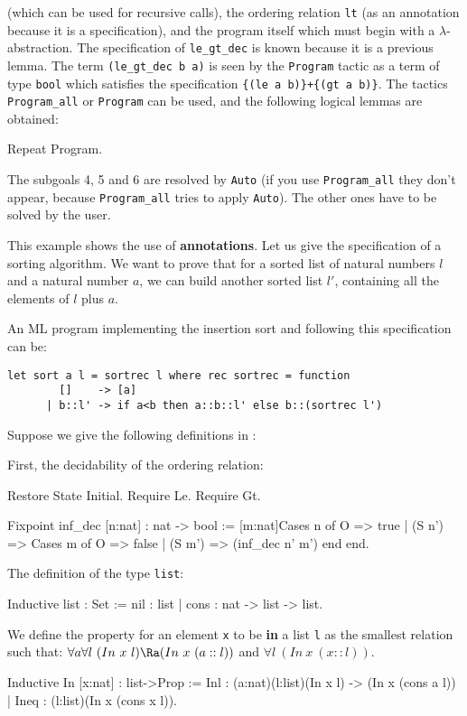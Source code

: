 (which can be used for recursive calls), the ordering relation
\verb=lt= (as an annotation because it is a specification), and the
program itself which must begin with a $\lambda$-abstraction. The
specification of \verb=le_gt_dec= is known because it is a previous
lemma.
The term \verb!(le_gt_dec b a)! is seen by the \verb!Program! tactic
as a term of type \verb!bool! which satisfies the specification 
\verb!{(le a b)}+{(gt a b)}!. 
The tactics \verb=Program_all= or \verb=Program= can be used, and the
following logical lemmas are obtained:
\begin{coq_example}
Repeat Program.
\end{coq_example}
The subgoals 4, 5 and 6 are resolved by \verb=Auto= (if you use
\verb=Program_all= they don't appear, because \verb=Program_all= tries
to apply \verb=Auto=). The other ones have to be solved by the user.


This example shows the use of {\bf annotations}. Let us give the
specification of a sorting algorithm. We want to prove that for a
sorted list of natural numbers $l$ and a natural number $a$, we can
build another sorted list $l'$, containing all the elements of $l$
plus $a$.

An ML program implementing the insertion sort and following this
specification can be:
\begin{verbatim}
let sort a l = sortrec l where rec sortrec = function
        []    -> [a]
      | b::l' -> if a<b then a::b::l' else b::(sortrec l')
\end{verbatim}
Suppose we give the following definitions in \Coq:

First, the decidability of the ordering relation:
\begin{coq_eval}
Restore State Initial.
Require Le.
Require Gt.
\end{coq_eval}
\begin{coq_example*}
Fixpoint inf_dec [n:nat] : nat -> bool :=
[m:nat]Cases n of
         O      => true
       | (S n') => Cases m of
                      O     => false 
                   | (S m') => (inf_dec n' m')
                   end 
       end.
\end{coq_example*}

The definition of the type \verb=list=:
\begin{coq_example*}
Inductive list : Set := nil : list | cons : nat -> list -> list.
\end{coq_example*}

We define the property for an element \verb=x= to be {\bf in} a list
\verb=l= as the smallest relation such that: $\forall a \forall
l~(In~x~l) \Ra (In~x~(a::l))$ and $\forall l~(In~x~(x::l))$.
\begin{coq_example*}
Inductive In [x:nat] : list->Prop
        := Inl  : (a:nat)(l:list)(In x l) -> (In x (cons a l))
        | Ineq : (l:list)(In x (cons x l)).
\end{coq_example*}

